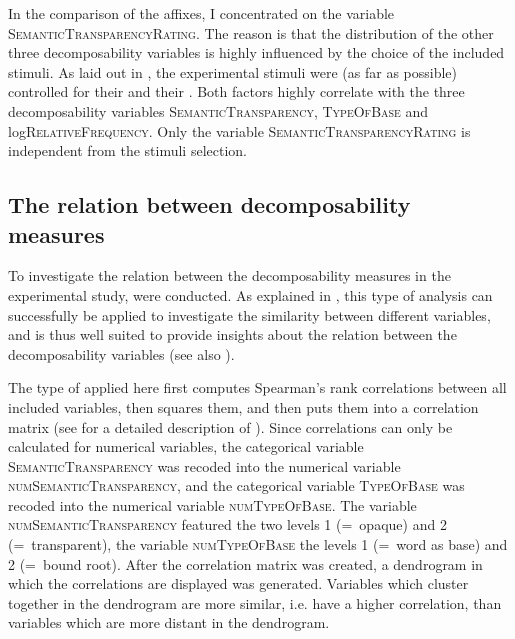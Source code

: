 In the  comparison of the affixes, I concentrated on the variable \textsc{SemanticTransparencyRating}. The reason is that the distribution of the other three decomposability variables is highly influenced by the choice of the included stimuli. 
 As laid out in , the experimental stimuli were (as far as possible) controlled for their   and their . Both factors highly correlate with the three decomposability variables \textsc{SemanticTransparency}, \textsc{TypeOfBase} and log\textsc{RelativeFrequency}. 
 Only the variable \textsc{SemanticTransparencyRating} is independent from the stimuli selection.



\subsection{The relation between decomposability measures}

To investigate the relation between the decomposability measures in the experimental study,  were conducted. As  explained in , this type of analysis can successfully be applied to investigate the similarity between different variables, and is thus well suited to provide insights about the relation between the decomposability variables (see also \citealt[200f.]{Baayen.2008}). 

The type of  applied here first computes Spearman's rank correlations between all included variables, then squares them, and then puts them into a correlation matrix  (see  for a detailed description of ). 
Since correlations can only be calculated for numerical variables, 
the categorical variable \textsc{SemanticTransparency}  was recoded into the numerical variable \textsc{numSemanticTransparency}, and the categorical variable \textsc{TypeOfBase} was recoded into the numerical variable \textsc{numTypeOfBase}.  The variable \textsc{numSemanticTransparency} featured  the two levels 1 (=~opaque) and 2 (=~transparent), the variable \textsc{numTypeOfBase} the levels 1 (=~word as base) and 2 (=~bound root). After the correlation matrix was created,  a dendrogram in which the correlations are displayed was generated. Variables which cluster together in the dendrogram are more similar, i.e. have a higher correlation, than variables which are more distant in the dendrogram. 


